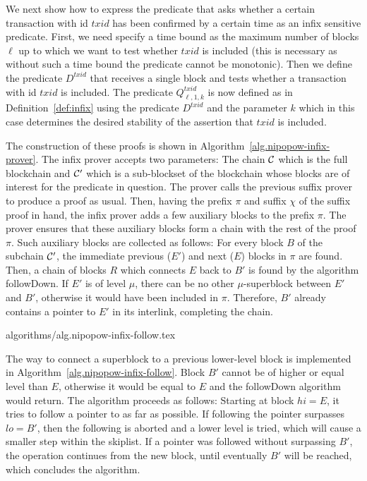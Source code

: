 We next show how to express the predicate that asks whether a certain
transaction with id $txid$ has been confirmed by a certain time as an infix
sensitive predicate. First, we need specify a time bound  as the maximum number
of blocks $\ell$ up to which we want to test whether $txid$ is included (this is
necessary as without such a time bound the predicate cannot be monotonic). Then
we define the predicate $D^{txid}$ that receives  a single block and tests
whether a transaction with id $txid$ is included. The predicate $Q^{txid}_{\ell,
1, k}$  is now defined as in Definition~\ref{def:infix}  using the predicate
$D^{txid}$ and the parameter $k$ which in this case  determines the desired
stability of the assertion that $txid$ is included.

The construction of these proofs is shown in
Algorithm~\ref{alg.nipopow-infix-prover}. The infix prover accepts two
parameters: The chain $\mathcal{C}$ which is the full blockchain and $\mathcal{C}'$ which
is a sub-blockset of the blockchain whose blocks are of interest for the
predicate in question. The prover calls the previous suffix prover to produce a
proof as usual. Then, having the prefix $\pi$ and suffix $\chi$ of the suffix
proof in hand, the infix prover adds a few auxiliary blocks to the prefix $\pi$.
The prover ensures that these auxiliary blocks form a chain with the rest of the
proof $\pi$. Such auxiliary blocks are collected as follows: For every block $B$
of the subchain $\mathcal{C}'$, the immediate previous ($E'$) and next ($E$) blocks
in $\pi$ are found. Then, a chain of blocks $R$ which connects $E$ back to $B'$
is found by the algorithm followDown. If $E'$ is of level $\mu$, there can be no
other $\mu$-superblock between $E'$ and $B'$, otherwise it would have been
included in $\pi$. Therefore, $B'$ already contains a pointer to $E'$ in its
interlink, completing the chain.

{algorithms/alg.nipopow-infix-follow.tex}

The way to connect a superblock to a previous lower-level block is implemented
in Algorithm~\ref{alg.nipopow-infix-follow}.  Block $B'$ cannot be of higher or
equal level than $E$, otherwise it would be equal to $E$ and the followDown
algorithm would return. The algorithm proceeds as follows: Starting at block $hi =
E$, it tries to follow a pointer to as far as possible. If following the pointer
surpasses $lo = B'$, then the following is aborted and a lower level is tried,
which will cause a smaller step within the skiplist. If a pointer was followed
without surpassing $B'$, the operation continues from the new block, until
eventually $B'$ will be reached, which concludes the algorithm.

